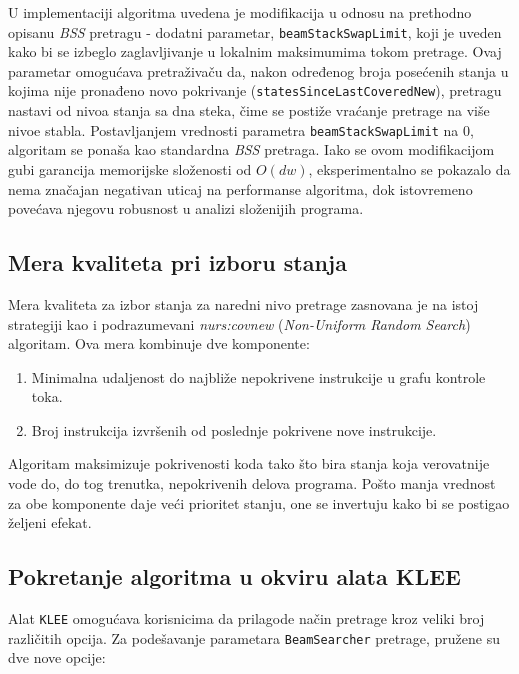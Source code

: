 \documentclass[a4paper]{article}
\begin{document}
U implementaciji algoritma uvedena je modifikacija u odnosu na prethodno opisanu \textit{BSS} pretragu - dodatni parametar, \verb|beamStackSwapLimit|, koji je uveden kako bi se izbeglo zaglavljivanje u lokalnim maksimumima tokom pretrage. Ovaj parametar omogućava pretraživaču da, nakon određenog broja posećenih stanja u kojima nije pronađeno novo pokrivanje (\verb|statesSinceLastCoveredNew|), pretragu nastavi od nivoa stanja sa dna steka, čime se postiže vraćanje pretrage na više nivoe stabla. Postavljanjem vrednosti parametra \verb|beamStackSwapLimit| na 0, algoritam se ponaša kao standardna \textit{BSS} pretraga. Iako se ovom modifikacijom gubi garancija memorijske složenosti od $O(dw)$, eksperimentalno se pokazalo da nema značajan negativan uticaj na performanse algoritma, dok istovremeno povećava njegovu robusnost u analizi složenijih programa.

\subsection{Mera kvaliteta pri izboru stanja}

Mera kvaliteta za izbor stanja za naredni nivo pretrage zasnovana je na istoj strategiji kao i podrazumevani \emph{nurs:covnew} (\emph{Non-Uniform Random Search}) algoritam. Ova mera kombinuje dve komponente:

\begin{enumerate}
\item Minimalna udaljenost do najbliže nepokrivene instrukcije u grafu kontrole toka.
\item Broj instrukcija izvršenih od poslednje pokrivene nove instrukcije.
\end{enumerate}

Algoritam maksimizuje pokrivenosti koda tako što bira stanja koja verovatnije vode do, do tog trenutka, nepokrivenih delova programa. Pošto manja vrednost za obe komponente daje veći prioritet stanju, one se invertuju kako bi se postigao željeni efekat.

\subsection{Pokretanje algoritma u okviru alata KLEE}

Alat \verb|KLEE| omogućava korisnicima da prilagode način pretrage kroz veliki broj različitih opcija. Za podešavanje parametara \verb|BeamSearcher| pretrage, pružene su dve nove opcije:
\end{document}

